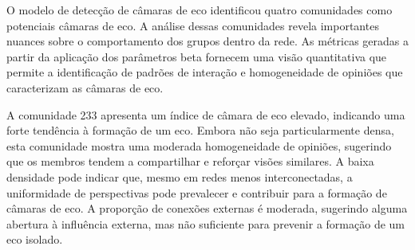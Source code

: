 \begin{table}[ht]
	\centering
	\caption{Resumo das Métricas de Câmaras de Eco das Comunidades em Santo André}
	\label{tab:community-metrics-santo-andre}
\end{table}

O modelo de detecção de câmaras de eco identificou quatro comunidades como potenciais câmaras de eco. A análise dessas comunidades revela importantes nuances sobre o comportamento dos grupos dentro da rede. As métricas geradas a partir da aplicação dos parâmetros beta fornecem uma visão quantitativa que permite a identificação de padrões de interação e homogeneidade de opiniões que caracterizam as câmaras de eco.

A comunidade 233 apresenta um índice de câmara de eco elevado, indicando uma forte tendência à formação de um eco. Embora não seja particularmente densa, esta comunidade mostra uma moderada homogeneidade de opiniões, sugerindo que os membros tendem a compartilhar e reforçar visões similares. A baixa densidade pode indicar que, mesmo em redes menos interconectadas, a uniformidade de perspectivas pode prevalecer e contribuir para a formação de câmaras de eco. A proporção de conexões externas é moderada, sugerindo alguma abertura à influência externa, mas não suficiente para prevenir a formação de um eco isolado.

